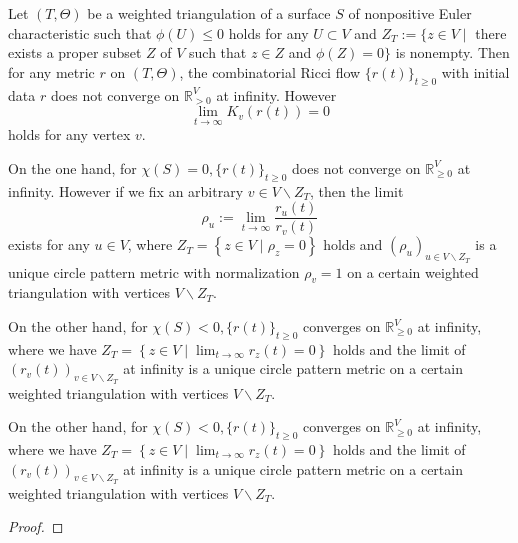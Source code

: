 \begin{theorem}\label{Asuka-Takatsu--theorem}
   \leanok
  Let $ (T, \Theta) $ be a weighted triangulation of a surface $ S $ of nonpositive Euler characteristic such that $ \phi(U) \leq 0 $ holds for any $ U \subset V $ and $ Z_{T}:=\{z \in V \mid $ there exists a proper subset $ Z $ of $ V $ such that $ z \in Z $ and $ \phi(Z)=0\} $ is nonempty. Then for any metric $ r $ on $ (T, \Theta) $, the combinatorial Ricci flow $ \{r(t)\}_{t \geq 0} $ with initial data $ r $ does not converge on $ \mathbb{R}_{>0}^{V} $ at infinity. However
  $$
  \lim _{t \rightarrow \infty} K_{v}(r(t))=0
  $$
  holds for any vertex $ v $.

  On the one hand, for $ \chi(S)=0,\{r(t)\}_{t \geq 0} $ does not converge on $ \mathbb{R}_{\geq 0}^{V} $ at infinity. However if we fix an arbitrary $ v \in V \backslash Z_{T} $, then the limit
  $$
  \rho_{u}:=\lim _{t \rightarrow \infty} \frac{r_{u}(t)}{r_{v}(t)}
  $$
  exists for any $ u \in V $, where $ Z_{T}=\left\{z \in V \mid \rho_{z}=0\right\} $ holds and $ \left(\rho_{u}\right)_{u \in V \backslash Z_{T}} $ is a unique circle pattern metric with normalization $ \rho_{v}=1 $ on a certain weighted triangulation with vertices $ V \backslash Z_{T} $.

  On the other hand, for $ \chi(S)<0,\{r(t)\}_{t \geq 0} $ converges on $ \mathbb{R}_{\geq 0}^{V} $ at infinity, where we have $ Z_{T}=\left\{z \in V \mid \lim _{t \rightarrow \infty} r_{z}(t)=0\right\} $ holds and the limit of $ \left(r_{v}(t)\right)_{v \in V \backslash Z_{T}} $ at infinity is a unique circle pattern metric on a certain weighted triangulation with vertices $ V \backslash Z_{T} $.

  On the other hand, for $ \chi(S)<0,\{r(t)\}_{t \geq 0} $ converges on $ \mathbb{R}_{\geq 0}^{V} $ at infinity, where we have $ Z_{T}=\left\{z \in V \mid \lim _{t \rightarrow \infty} r_{z}(t)=0\right\} $ holds and the limit of $ \left(r_{v}(t)\right)_{v \in V \backslash Z_{T}} $ at infinity is a unique circle pattern metric on a certain weighted triangulation with vertices $ V \backslash Z_{T} $.
\end{theorem}

\begin{proof}
\end{proof}
